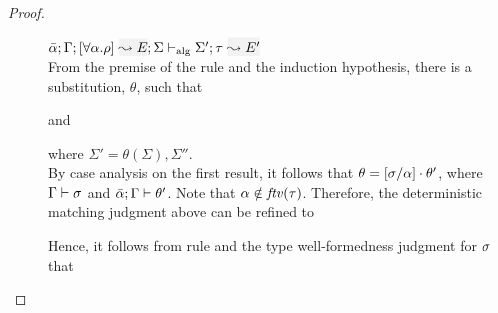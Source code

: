\begin{proof}
\begin{description}
\item[]\quad
\(\admres{\bar\alpha}{\tenv}{\tall{\alpha}{\rulet}}{E}{\Sigma}{\type}{E'}{\Sigma'}\)\ \\

From the premise of the rule and the induction hypothesis, there is a substitution, \(\theta\), such that
\begin{myequation*}
  \validsubst{\bar\alpha,\alpha}{\tenv,\alpha}{\theta}
\end{myequation*}
and
\begin{myequation*}
\end{myequation*}
where $\Sigma' = \theta(\Sigma),\Sigma''$.\\

By case analysis on the first result, it follows that \(\theta = [\sigma/\alpha]\cdot\theta'\),
where \({\Gamma \vdash \sigma}\) and \({\bar\alpha; \Gamma \vdash \theta'}\). Note that
\(\alpha\notin{\it ftv }(\tau)\). Therefore, the deterministic matching judgment above can be
refined to
\begin{myequation*}
\end{myequation*}
Hence, it follows from rule  and the type well-formedness judgment for \(\sigma\)
that
\begin{myequation*}
\end{myequation*}
\end{description}
\end{proof}

%

